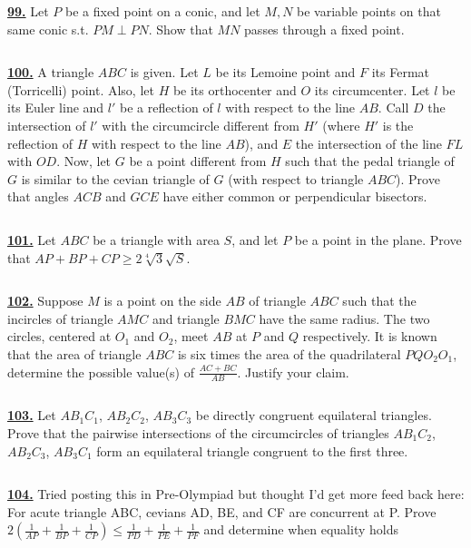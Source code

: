 \documentclass{article}
\begin{document}
$$ $$

\href{ http://www.artofproblemsolving.com/Forum/viewtopic.php?p=117045#p117045
}{\bf 99.} Let $P$ be a fixed point on a conic, and let $M,N$ be variable points on that same conic s.t. $PM\perp PN$. Show that $MN$ passes through a fixed point.

$$ $$

\href{ http://www.artofproblemsolving.com/Forum/viewtopic.php?p=239221#p239221
}{\bf 100.} A triangle $ABC$ is given. Let $L$ be its Lemoine point and $F$ its Fermat (Torricelli) point. Also, let $H$ be its orthocenter and $O$ its circumcenter. Let $l$ be its Euler line and $l'$ be a reflection of $l$ with respect to the line $AB$. Call $D$ the intersection of $l'$ with the circumcircle different from $H'$ (where $H'$ is the reflection of $H$ with respect to the line $AB$), and $E$ the intersection of the line $FL$ with $OD$. Now, let $G$ be a point different from $H$ such that the pedal triangle of $G$ is similar to the cevian triangle of $G$ (with respect to triangle $ABC$). Prove that angles $ACB$ and $GCE$ have either common or perpendicular bisectors.

$$ $$

\href{http://www.artofproblemsolving.com/Forum/viewtopic.php?p=230527#p230527
 }{\bf 101.} Let $ABC$ be a triangle with area $S$, and let $P$ be a point in the plane. Prove that $AP+BP+CP\geq 2\sqrt[4]{3}\sqrt{S}$.


$$ $$

\href{http://www.artofproblemsolving.com/Forum/viewtopic.php?p=124968#p124968
 }{\bf 102.} Suppose $M$ is a point on the side $AB$ of triangle $ABC$ such that the incircles of triangle $AMC$ and triangle $BMC$ have the same radius. The two circles, centered at $O_1$ and $O_2$, meet $AB$ at $P$ and $Q$ respectively. It is known that the area of triangle $ABC$ is six times the area of the quadrilateral $PQO_2O_1$, determine the possible value(s) of $\frac{AC+BC}{AB}$. Justify your claim.


$$ $$

\href{ http://www.artofproblemsolving.com/Forum/viewtopic.php?p=146876#p146876
}{\bf 103.} Let $AB_{1}C_{1}$, $AB_{2}C_{2}$, $AB_{3}C_{3}$ be directly congruent equilateral triangles. Prove that the pairwise intersections of the circumcircles of triangles $AB_{1}C_{2}$, $AB_{2}C_{3}$, $AB_{3}C_{1}$ form an equilateral triangle congruent to the first three.


$$ $$

\href{ http://www.artofproblemsolving.com/Forum/viewtopic.php?p=201120#p201120
}{\bf 104.} Tried posting this in Pre-Olympiad but thought I'd get more feed back here:
For acute triangle ABC, cevians AD, BE, and CF are concurrent at P.
Prove
$\displaystyle 2\left(\frac{1}{AP}+\frac{1}{BP}+\frac{1}{CP}\right)\leq \frac{1}{PD}+\frac{1}{PE}+\frac{1}{PF}$
and determine when equality holds
\end{document}
